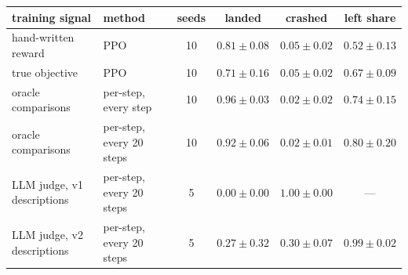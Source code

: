 \begin{tabular}{llcccc}
\toprule
training signal & method & seeds & landed & crashed & left share \\
\midrule
hand-written reward & PPO & 10 & $0.81\pm0.08$ & $0.05\pm0.02$ & $0.52\pm0.13$ \\
true objective & PPO & 10 & $0.71\pm0.16$ & $0.05\pm0.02$ & $0.67\pm0.09$ \\
oracle comparisons & per-step, every step & 10 & $0.96\pm0.03$ & $0.02\pm0.02$ & $0.74\pm0.15$ \\
oracle comparisons & per-step, every 20 steps & 10 & $0.92\pm0.06$ & $0.02\pm0.01$ & $0.80\pm0.20$ \\
LLM judge, v1 descriptions & per-step, every 20 steps & 5 & $0.00\pm0.00$ & $1.00\pm0.00$ & --- \\
LLM judge, v2 descriptions & per-step, every 20 steps & 5 & $0.27\pm0.32$ & $0.30\pm0.07$ & $0.99\pm0.02$ \\
\bottomrule
\end{tabular}
